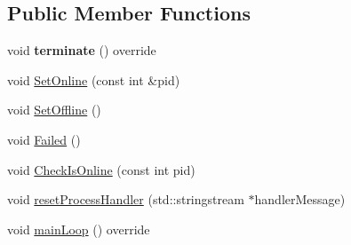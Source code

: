 \subsection*{Public Member Functions}
\begin{DoxyCompactItemize}
\item 
void {\bfseries terminate} () override\hypertarget{structProcessControlModule_aa99b03cec10164e4206cc1fe16ac125f}{}\label{structProcessControlModule_aa99b03cec10164e4206cc1fe16ac125f}

\item 
void \hyperlink{structProcessControlModule_a024e9400a25c321f0adec1b56f1ec4b9}{Set\+Online} (const int \&pid)
\item 
void \hyperlink{structProcessControlModule_ac3e106db5a3547a55389ddc35e7df675}{Set\+Offline} ()
\item 
void \hyperlink{structProcessControlModule_a386c9f77a4da6cd95b5ffb0007f3c27d}{Failed} ()
\item 
void \hyperlink{structProcessControlModule_a4df7e3fdb51ab49df9867ac9b8a7d29b}{Check\+Is\+Online} (const int pid)
\item 
void \hyperlink{structProcessControlModule_ad6b88baf5da957ca448220eab1b29f5c}{reset\+Process\+Handler} (std\+::stringstream $\ast$handler\+Message)
\item 
void \hyperlink{structProcessControlModule_ac3024292ea7763b6bc2b15a710f0f5ed}{main\+Loop} () override
\end{DoxyCompactItemize}
